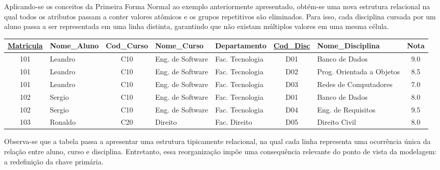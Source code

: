 \begin{tcolorbox}[breakable, colback=blue!5,colframe=blue!40!black,title=Situação exemplo]

    Aplicando-se os conceitos da Primeira Forma Normal ao exemplo anteriormente apresentado, obtém-se uma nova estrutura relacional na qual todos os atributos passam a conter valores atômicos e os grupos repetitivos são eliminados. Para isso, cada disciplina cursada por um aluno passa a ser representada em uma linha distinta, garantindo que não existam múltiplos valores em uma mesma célula.

    \vspace{0.4cm}

    \centering
    \renewcommand{\arraystretch}{1.2}

    \begin{adjustbox}{max width=\textwidth}
    \begin{tabular}{|c|l|c|l|l|c|l|c|}
    \hline
    \textbf{\underline{Matricula}} & \textbf{Nome\_Aluno} & \textbf{Cod\_Curso} & \textbf{Nome\_Curso} & \textbf{Departamento} & \textbf{\underline{Cod\_Disc}} & \textbf{Nome\_Disciplina} & \textbf{Nota} \\ \hline
    101 & Leandro & C10 & Eng. de Software & Fac. Tecnologia & D01 & Banco de Dados & 9.0 \\ \hline
    101 & Leandro & C10 & Eng. de Software & Fac. Tecnologia & D02 & Prog. Orientada a Objetos & 8.5 \\ \hline
    101 & Leandro & C10 & Eng. de Software & Fac. Tecnologia & D03 & Redes de Computadores & 7.0 \\ \hline
    102 & Sergio & C10 & Eng. de Software & Fac. Tecnologia & D01 & Banco de Dados & 8.0 \\ \hline
    102 & Sergio & C10 & Eng. de Software & Fac. Tecnologia & D04 & Eng. de Requisitos & 9.5 \\ \hline
    103 & Ronaldo & C20 & Direito & Fac. Direito & D05 & Direito Civil & 8.0 \\ \hline
    \end{tabular}
\end{adjustbox}
    \vspace{0.3cm}
    \label{tab:1fn2}

    \vspace{0.4cm}

    \justify

    Observa-se que a tabela passa a apresentar uma estrutura tipicamente relacional, na qual cada linha representa uma ocorrência única da relação entre aluno, curso e disciplina. Entretanto, essa reorganização impõe uma consequência relevante do ponto de vista da modelagem: a redefinição da chave primária.


\end{tcolorbox}
